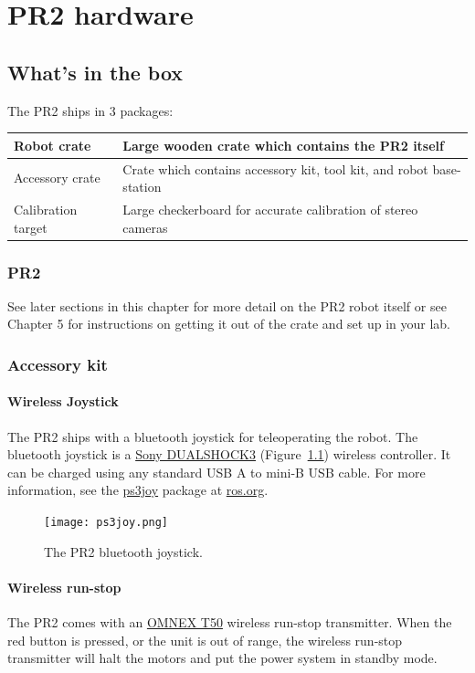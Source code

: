 \chapter{PR2 hardware}

\section{What's in the box}
The PR2 ships in 3 packages:

\begin{tabularx}{\linewidth}{| l | X |}
\hline      
  Robot crate & Large wooden crate which contains the PR2 itself \\ \hline
  Accessory crate & Crate which contains accessory kit, tool kit, and robot base-station \\ \hline
  Calibration target & Large checkerboard for accurate calibration of stereo cameras \\ \hline
\end{tabularx}

\subsection{PR2}
See later sections in this chapter for more detail on the PR2 robot itself or see Chapter 5 for instructions on getting it out of the crate and set up in your lab.
\subsection{Accessory kit}
\subsubsection{Wireless Joystick}
The PR2 ships with a bluetooth joystick for teleoperating the robot. The
bluetooth joystick is a
\href{http://www.sonystyle.com/webapp/wcs/stores/servlet/ProductDisplay?catalogId=10551&storeId=10151&langId=-1&productId=8198552921665411965#additionalImage1%22}{Sony
  DUALSHOCK3} (Figure~\ref{fig:ps3joy}) wireless controller. It can be charged
using any standard USB A to mini-B USB cable. For more information, see the
\href{http://www.ros.org/wiki/ps3joy}{ps3joy} package at
\href{http://www.ros.org}{ros.org}.

\begin{figure}[ht]
\centering
\texttt{[image: ps3joy.png]}
\caption{The PR2 bluetooth joystick.}
\label{fig:ps3joy}
\end{figure}

\subsubsection{Wireless run-stop}
\label{wirelessrunstop}
The PR2 comes with an
\href{http://www.omnexcontrols.com/products/portable/t50.html}{OMNEX T50}
wireless run-stop transmitter. When the red button is pressed, or the unit is
out of range, the wireless run-stop transmitter will halt the motors and put the
power system in standby mode.

